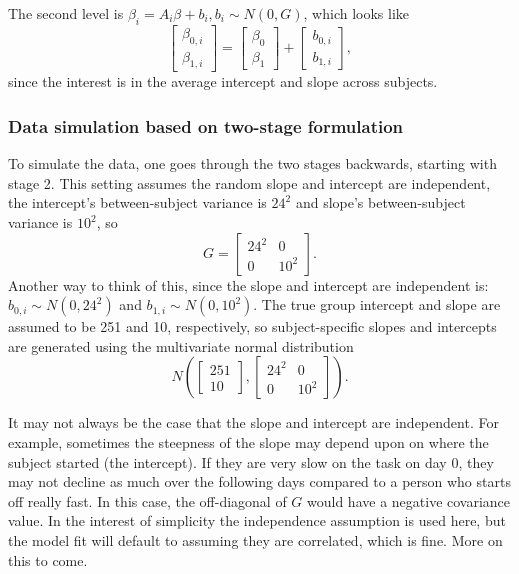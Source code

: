 \documentclass[]{book}
\begin{document}
The second level is \(\beta_i = A_i\beta +b_i, b_i\sim N(0, G)\), which
looks like
\[\left[\begin{array}{c}\beta_{0,i} \\ \beta_{1,i}\end{array}\right] =\left[\begin{array}{c}\beta_{0} \\ \beta_{1}\end{array}\right] + \left[\begin{array}{c}b_{0,i} \\ b_{1,i}\end{array}\right],\]
since the interest is in the average intercept and slope across
subjects.

\subsubsection{Data simulation based on two-stage
formulation}\label{data-simulation-based-on-two-stage-formulation}

To simulate the data, one goes through the two stages backwards,
starting with stage 2. This setting assumes the random slope and
intercept are independent, the intercept's between-subject variance is
\(24^2\) and slope's between-subject variance is \(10^2\), so
\[G=\left[\begin{array}{cc} 24^2 & 0 \\ 0 & 10^2 \end{array}\right].\]
Another way to think of this, since the slope and intercept are
independent is: \(b_{0,i}\sim N(0, 24^2)\) and
\(b_{1,i}\sim N(0, 10^2)\). The true group intercept and slope are
assumed to be 251 and 10, respectively, so subject-specific slopes and
intercepts are generated using the multivariate normal distribution
\[N\left(\left[\begin{array}{c} 251 \\ 10 \end{array}\right], \left[\begin{array}{cc} 24^2 & 0 \\ 0 & 10^2 \end{array}\right]\right).\]

It may not always be the case that the slope and intercept are
independent. For example, sometimes the steepness of the slope may
depend upon on where the subject started (the intercept). If they are
very slow on the task on day 0, they may not decline as much over the
following days compared to a person who starts off really fast. In this
case, the off-diagonal of \(G\) would have a negative covariance value.
In the interest of simplicity the independence assumption is used here,
but the model fit will default to assuming they are correlated, which is
fine. More on this to come.
\end{document}

